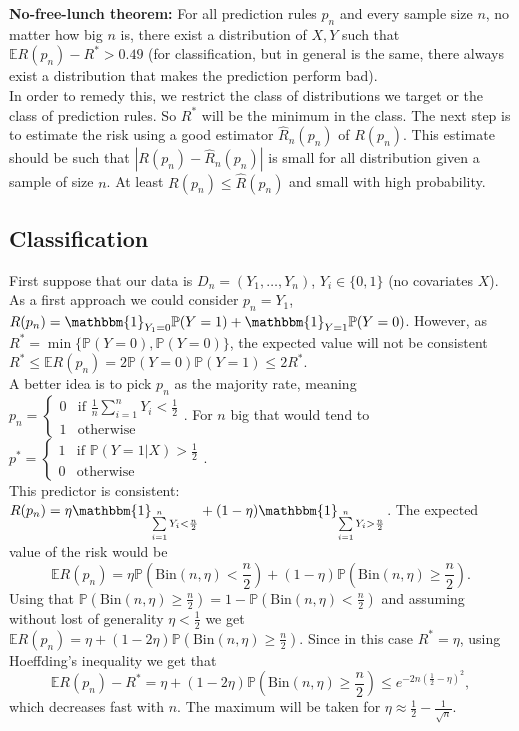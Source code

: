 \documentclass[11pt, english]{article}
\begin{document}
\textbf{No-free-lunch theorem:} For all prediction rules $p_n$ and every sample size $n$, no matter how big $n$ is, there exist a distribution of $X,Y$ such that $\mathbb{E}R(p_n)-R^*>0.49$ (for classification, but in general is the same, there always exist a distribution that makes the prediction perform bad). \\

In order to remedy this, we restrict the class of distributions we target or the class of prediction rules. So $R^*$ will be the minimum in the class. The next step is to estimate the risk using a good estimator $\hat{R}_n(p_n)$ of $R(p_n)$. This estimate should be such that $|R(p_n)-\hat{R}_n(p_n)|$ is small for all distribution given a sample of size $n$. At least $R(p_n)\leq \hat{R}(p_n)$ and small with high probability.
\subsection{Classification}

First suppose that our data is $D_n=(Y_1,\dots,Y_n)$, $Y_i\in\{0,1\}$ (no covariates $X$).\\

As a first approach we could consider $p_n=Y_1$, $R(p_n)=\mathbbm{1}_{Y_1=0}\mathbb{P}(Y=1)+\mathbbm{1}_{Y=1}\mathbb{P}(Y=0)$. However, as $R^*=\min\{\mathbb{P}(Y=0),\mathbb{P}(Y=0)\}$, the expected value will not be consistent $R^*\leq\mathbb{E}R(p_n)=2\mathbb{P}(Y=0)\mathbb{P}(Y=1)\leq 2R^*$.\\

A better idea is to pick $p_n$ as the majority rate, meaning $p_n=\left\{\begin{array}{ll}
0 & \text{if }\frac{1}{n}\sum\limits_{i=1}^nY_i<\frac{1}{2}\\
1 & \text{otherwise}
\end{array}\right.$. For $n$ big that would tend to $p^*=\left\{\begin{array}{ll}
1 & \text{if }\mathbb{P}(Y=1|X)>\frac{1}{2}\\
0 & \text{otherwise}\end{array}\right.$. \\
This predictor is consistent: $R(p_n)=\eta\mathbbm{1}_{\sum\limits_{i=1}^nY_i<\frac{n}{2}}+(1-\eta)\mathbbm{1}_{\sum\limits_{i=1}^nY_i>\frac{n}{2}}$. The expected value  of the risk would be
\begin{equation}
	\mathbb{E}R(p_n)=\eta\mathbb{P}(\text{Bin}(n,\eta)<\frac{n}{2})+(1-\eta)\mathbb{P}(\text{Bin}(n,\eta)\geq\frac{n}{2}).
\end{equation}
Using that $\mathbb{P}(\text{Bin}(n,\eta)\geq\frac{n}{2})=1-\mathbb{P}(\text{Bin}(n,\eta)<\frac{n}{2})$ and assuming without lost of generality $\eta<\frac{1}{2}$ we get $\mathbb{E}R(p_n)=\eta+(1-2\eta)\mathbb{P}(\text{Bin}(n,\eta)\geq\frac{n}{2})$. Since in this case $R^*=\eta$, using Hoeffding's inequality we get that 
\begin{equation}
	\mathbb{E}R(p_n)-R^*=\eta+(1-2\eta)\mathbb{P}(\text{Bin}(n,\eta)\geq\frac{n}{2})\leq e^{-2n(\frac{1}{2}-\eta)^2},
\end{equation}
which decreases fast with $n$. The maximum will be taken for $\eta\approx \frac{1}{2}-\frac{1}{\sqrt{n}}$.
\end{document}
